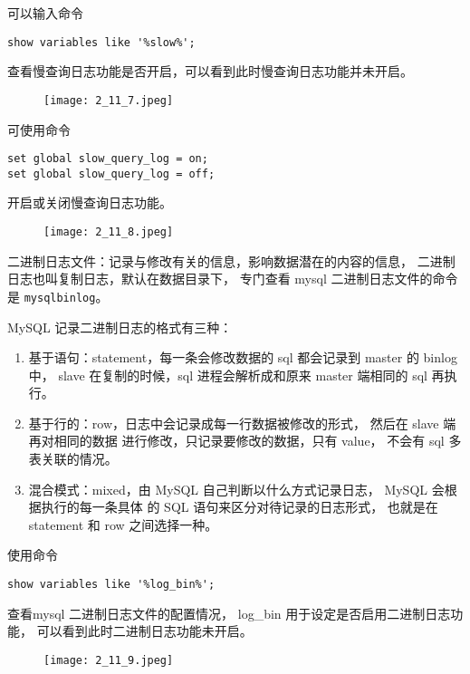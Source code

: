 可以输入命令
\begin{verbatim}
show variables like '%slow%';
\end{verbatim}
查看慢查询日志功能是否开启，可以看到此时慢查询日志功能并未开启。
\begin{figure}[H]
  \begin{center}
    \texttt{[image: 2\_11\_7.jpeg]}
  \end{center}
\end{figure}

可使用命令
\begin{verbatim}
set global slow_query_log = on;
set global slow_query_log = off;
\end{verbatim}
开启或关闭慢查询日志功能。
\begin{figure}[H]
  \begin{center}
    \texttt{[image: 2\_11\_8.jpeg]}
  \end{center}
\end{figure}

二进制日志文件：记录与修改有关的信息，影响数据潜在的内容的信息，
二进制日志也叫复制日志，默认在数据目录下，
专门查看 mysql 二进制日志文件的命令是 \texttt{mysqlbinlog}。

MySQL 记录二进制日志的格式有三种：
\begin{enumerate}
  \item 基于语句：statement，每一条会修改数据的 sql 都会记录到 master 的 binlog 中，
    slave 在复制的时候，sql 进程会解析成和原来 master 端相同的
    sql 再执行。
  \item 基于行的：row，日志中会记录成每一行数据被修改的形式，
    然后在 slave 端再对相同的数据
    进行修改，只记录要修改的数据，只有 value，
    不会有 sql 多表关联的情况。
  \item 混合模式：mixed，由 MySQL 自己判断以什么方式记录日志，
    MySQL 会根据执行的每一条具体
    的 SQL 语句来区分对待记录的日志形式，
    也就是在 statement 和 row 之间选择一种。
\end{enumerate}

使用命令
\begin{verbatim}
show variables like '%log_bin%';
\end{verbatim}
查看mysql 二进制日志文件的配置情况，
log\_bin 用于设定是否启用二进制日志功能，
可以看到此时二进制日志功能未开启。
\begin{figure}[H]
  \begin{center}
    \texttt{[image: 2\_11\_9.jpeg]}
  \end{center}
\end{figure}
